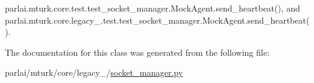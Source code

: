 parlai.\+mturk.\+core.\+test.\+test\+\_\+socket\+\_\+manager.\+Mock\+Agent.\+send\+\_\+heartbeat(), and parlai.\+mturk.\+core.\+legacy\+\_.\+test.\+test\+\_\+socket\+\_\+manager.\+Mock\+Agent.\+send\+\_\+heartbeat().



The documentation for this class was generated from the following file\+:\begin{DoxyCompactItemize}
\item 
parlai/mturk/core/legacy\+\_/\hyperlink{legacy__2018_2socket__manager_8py}{socket\+\_\+manager.\+py}\end{DoxyCompactItemize}
